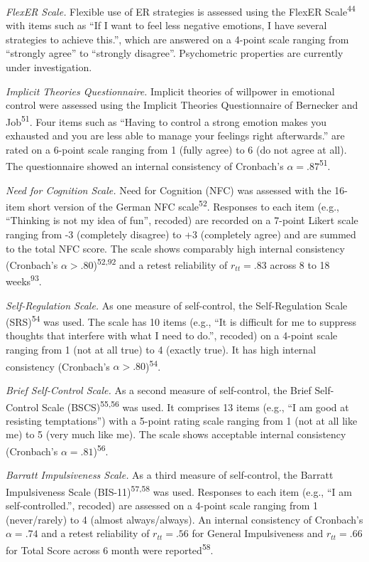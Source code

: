 \documentclass[
  man,floatsintext]{apa6}
\begin{document}
\emph{FlexER Scale.} Flexible use of ER strategies is assessed using the FlexER Scale\textsuperscript{44} with items such as ``If I want to feel less negative emotions, I have several strategies to achieve this.'', which are answered on a 4-point scale ranging from ``strongly agree'' to ``strongly disagree''.
Psychometric properties are currently under investigation.

\emph{Implicit Theories Questionnaire.} Implicit theories of willpower in emotional control were assessed using the Implicit Theories Questionnaire of Bernecker and Job\textsuperscript{51}.
Four items such as ``Having to control a strong emotion makes you exhausted and you are less able to manage your feelings right afterwards.'' are rated on a 6-point scale ranging from 1 (fully agree) to 6 (do not agree at all).
The questionnaire showed an internal consistency of Cronbach's \(\alpha=.87\)\textsuperscript{51}.

\emph{Need for Cognition Scale.} Need for Cognition (NFC) was assessed with the 16-item short version of the German NFC scale\textsuperscript{52}.
Responses to each item (e.g., ``Thinking is not my idea of fun'', recoded) are recorded on a 7-point Likert scale ranging from -3 (completely disagree) to +3 (completely agree) and are summed to the total NFC score.
The scale shows comparably high internal consistency (Cronbach's \(\alpha>.80\))\textsuperscript{52,92} and a retest reliability of \(r_{tt}=.83\) across 8 to 18 weeks\textsuperscript{93}.

\emph{Self-Regulation Scale.} As one measure of self-control, the Self-Regulation Scale (SRS)\textsuperscript{54} was used. The scale has 10 items (e.g., ``It is difficult for me to suppress thoughts that interfere with what I need to do.'', recoded) on a 4-point scale ranging from 1 (not at all true) to 4 (exactly true).
It has high internal consistency (Cronbach's \(\alpha>.80\))\textsuperscript{54}.

\emph{Brief Self-Control Scale.} As a second measure of self-control, the Brief Self-Control Scale (BSCS)\textsuperscript{55,56} was used.
It comprises 13 items (e.g., ``I am good at resisting temptations'') with a 5-point rating scale ranging from 1 (not at all like me) to 5 (very much like me).
The scale shows acceptable internal consistency (Cronbach's \(\alpha=.81\))\textsuperscript{56}.

\emph{Barratt Impulsiveness Scale.} As a third measure of self-control, the Barratt Impulsiveness Scale (BIS-11)\textsuperscript{57,58} was used.
Responses to each item (e.g., ``I am self-controlled.'', recoded) are assessed on a 4-point scale ranging from 1 (never/rarely) to 4 (almost always/always).
An internal consistency of Cronbach's \(\alpha=.74\) and a retest reliability of \(r_{tt}=.56\) for General Impulsiveness and \(r_{tt}=.66\) for Total Score across 6 month were reported\textsuperscript{58}.
\end{document}
